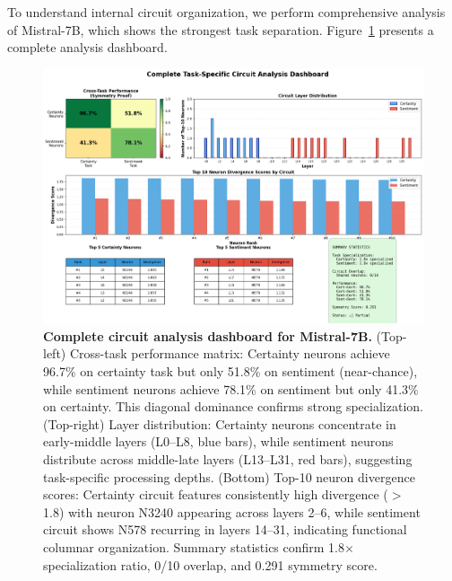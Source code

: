 \documentclass{article}
\begin{document}
To understand internal circuit organization, we perform comprehensive analysis of Mistral-7B, which shows the strongest task separation. Figure~\ref{fig:dashboard} presents a complete analysis dashboard.

\begin{figure}[t]
\centering
\includegraphics[width=\textwidth]{./figures/complete_circuit_dashboard.png}
\caption{\textbf{Complete circuit analysis dashboard for Mistral-7B.} (Top-left) Cross-task performance matrix: Certainty neurons achieve 96.7\% on certainty task but only 51.8\% on sentiment (near-chance), while sentiment neurons achieve 78.1\% on sentiment but only 41.3\% on certainty. This diagonal dominance confirms strong specialization. (Top-right) Layer distribution: Certainty neurons concentrate in early-middle layers (L0--L8, blue bars), while sentiment neurons distribute across middle-late layers (L13--L31, red bars), suggesting task-specific processing depths. (Bottom) Top-10 neuron divergence scores: Certainty circuit features consistently high divergence ($>$1.8) with neuron N3240 appearing across layers 2--6, while sentiment circuit shows N578 recurring in layers 14--31, indicating functional columnar organization. Summary statistics confirm 1.8$\times$ specialization ratio, 0/10 overlap, and 0.291 symmetry score.}
\label{fig:dashboard}
\end{figure}
\end{document}
